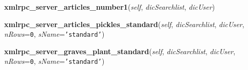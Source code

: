     \label{cuon:Report:Report:xmlrpc_server_articles_number1}

    \vspace{0.5ex}

\hspace{.8\funcindent}\begin{boxedminipage}{\funcwidth}

    \raggedright \textbf{xmlrpc\_server\_articles\_number1}(\textit{self}, \textit{dicSearchlist}, \textit{dicUser})

\setlength{\parskip}{2ex}
\setlength{\parskip}{1ex}
    \end{boxedminipage}

    \label{cuon:Report:Report:xmlrpc_server_articles_pickles_standard}

    \vspace{0.5ex}

\hspace{.8\funcindent}\begin{boxedminipage}{\funcwidth}

    \raggedright \textbf{xmlrpc\_server\_articles\_pickles\_standard}(\textit{self}, \textit{dicSearchlist}, \textit{dicUser}, \textit{nRows}={\tt 0}, \textit{sName}={\tt \texttt{'}\texttt{standard}\texttt{'}})

\setlength{\parskip}{2ex}
\setlength{\parskip}{1ex}
    \end{boxedminipage}

    \label{cuon:Report:Report:xmlrpc_server_graves_plant_standard}

    \vspace{0.5ex}

\hspace{.8\funcindent}\begin{boxedminipage}{\funcwidth}

    \raggedright \textbf{xmlrpc\_server\_graves\_plant\_standard}(\textit{self}, \textit{dicSearchlist}, \textit{dicUser}, \textit{nRows}={\tt 0}, \textit{sName}={\tt \texttt{'}\texttt{standard}\texttt{'}})

\setlength{\parskip}{2ex}
\setlength{\parskip}{1ex}
    \end{boxedminipage}

